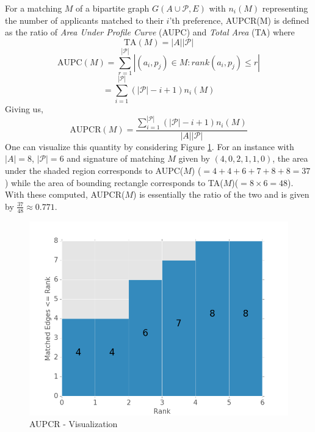 \documentclass[letterpaper]{article} %
\begin{document}
For a matching $M$ of a bipartite graph $G(A\cup \mathcal{P}, E)$ with $n_i(M)$ representing the number of applicants matched to their $i$'th preference, AUPCR(M) is defined as the ratio of \textit{Area Under Profile Curve} (AUPC) and \textit{Total Area} (TA) where
\begin{equation}
\text{TA}(M) = {|A||\mathcal{P}|}
\end{equation}
\begin{equation*}
\text{AUPC}(M) = {\sum_{r=1}^{|\mathcal{P}|}|(a_{i},p_{j}) \in M:rank(a_{i},p_{j})\leq r|}
\end{equation*}
\begin{equation} \label{defAupc}
= {\sum_{i=1}^{|\mathcal{P}|} (|\mathcal{P}|-i+1) n_i(M)}
\end{equation}
Giving us,
\begin{equation} \label{defAupcr}
\text{AUPCR}(M) = \frac{\sum_{i=1}^{|\mathcal{P}|} (|\mathcal{P}|-i+1) n_i(M)}{|A||\mathcal{P}|}
\end{equation}
One can visualize this quantity by considering Figure \ref{AUPCR}. For an instance with $|A|=8$, $|\mathcal{P}|=6$ and signature of matching $M$ given by $(4,0,2,1,1,0)$, the area under the shaded region corresponds to AUPC($M$) ($= 4+4+6+7+8+8 = 37$) while the area of bounding rectangle corresponds to TA($M$)($=8 \times 6=48$). With these computed, AUPCR($M$) is essentially the ratio of the two and is given by $\frac{37}{48} \approx 0.771$.
\begin{figure}[h]
	\centering
	\includegraphics[scale=0.35]{aupcr.png}
    \caption{AUPCR - Visualization}
    \label{AUPCR}
\end{figure}
\end{document}
